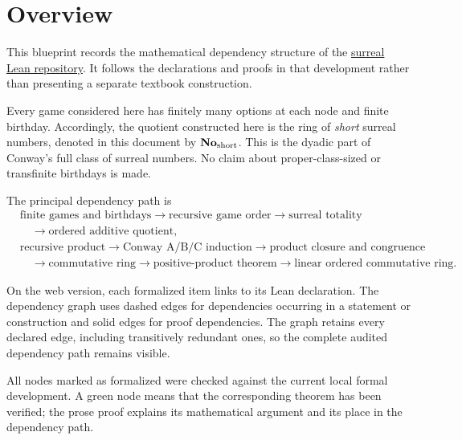\chapter{Overview}

This blueprint records the mathematical dependency structure of the
\href{https://github.com/kdwong/surreal}{surreal Lean repository}.  It follows the declarations
and proofs in that development rather than presenting a separate textbook construction.

Every game considered here has finitely many options at each node and finite birthday.
Accordingly, the quotient constructed here is the ring of
\emph{short} surreal numbers, denoted in this document by \(\mathbf{No}_{\mathrm{short}}\).  This is the dyadic
part of Conway's full class of surreal numbers.  No claim about proper-class-sized or
transfinite birthdays is made.

The principal dependency path is
\[
\begin{aligned}
  &\text{finite games and birthdays}
  \longrightarrow \text{recursive game order}
  \longrightarrow \text{surreal totality} \\
  &\quad\longrightarrow \text{ordered additive quotient},\\[2mm]
  &\text{recursive product}
  \longrightarrow \text{Conway A/B/C induction}
  \longrightarrow \text{product closure and congruence}\\
  &\quad\longrightarrow \text{commutative ring}
  \longrightarrow \text{positive-product theorem}
  \longrightarrow \text{linear ordered commutative ring}.
\end{aligned}
\]

On the web version, each formalized item links to its Lean declaration.  The dependency
graph uses dashed edges for dependencies occurring in a statement or construction and solid
edges for proof dependencies.  The graph retains every declared edge, including transitively
redundant ones, so the complete audited dependency path remains visible.

All nodes marked as formalized were checked against the current local formal development.  A
green node means that the corresponding theorem has been verified; the prose proof explains
its mathematical argument and its place in the dependency path.

